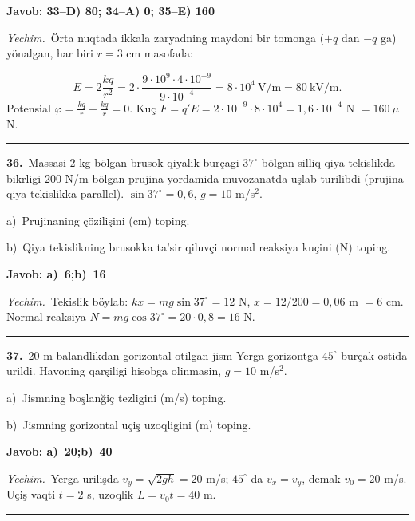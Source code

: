 \documentclass[11pt,a4paper]{article}
\begin{document}
\noindent\colorbox{gray!12}{\parbox{\dimexpr\linewidth-2\fboxsep}{\textbf{Javob: 33--D) 80; 34--A) 0; 35--E) 160}}}\par\smallskip
\noindent\textit{Yechim.}\ Örta nuqtada ikkala zaryadning maydoni bir tomonga ($+q$ dan $-q$ ga) yönalgan, har biri $r=3$ cm masofada:\par
\[E=2\frac{kq}{r^2}=2\cdot\frac{9\cdot10^9\cdot4\cdot10^{-9}}{9\cdot10^{-4}}=8\cdot10^4\ \text{V/m}=80\ \text{kV/m}.\]
Potensial $\varphi=\frac{kq}{r}-\frac{kq}{r}=0$. Kuç $F=q'E=2\cdot10^{-9}\cdot8\cdot10^4=1{,}6\cdot10^{-4}$ N $=160\ \mu$N.\par\par\medskip\hrule\medskip
{}\noindent\textbf{36.}\ Massasi 2 kg bölgan brusok qiyalik burçagi $37^\circ$ bölgan silliq qiya tekislikda bikrligi 200 N/m bölgan prujina yordamida muvozanatda uşlab turilibdi (prujina qiya tekislikka parallel). $\sin37^\circ=0{,}6$, $g=10$ m/s$^2$.\par
\noindent\hspace*{4mm}a)\ Prujinaning çözilişini (cm) toping.\par
\noindent\hspace*{4mm}b)\ Qiya tekislikning brusokka ta’sir qiluvçi normal reaksiya kuçini (N) toping.\par
\noindent\colorbox{gray!12}{\parbox{\dimexpr\linewidth-2\fboxsep}{\textbf{Javob: a)\ 6;\quad b)\ 16}}}\par\smallskip
\noindent\textit{Yechim.}\ Tekislik böylab: $kx=mg\sin37^\circ=12$ N, $x=12/200=0{,}06$ m $=6$ cm. Normal reaksiya $N=mg\cos37^\circ=20\cdot0{,}8=16$ N.\par\par\medskip\hrule\medskip
{}\noindent\textbf{37.}\ 20 m balandlikdan gorizontal otilgan jism Yerga gorizontga $45^\circ$ burçak ostida urildi. Havoning qarşiligi hisobga olinmasin, $g=10$ m/s$^2$.\par
\noindent\hspace*{4mm}a)\ Jismning boşlanğiç tezligini (m/s) toping.\par
\noindent\hspace*{4mm}b)\ Jismning gorizontal uçiş uzoqligini (m) toping.\par
\noindent\colorbox{gray!12}{\parbox{\dimexpr\linewidth-2\fboxsep}{\textbf{Javob: a)\ 20;\quad b)\ 40}}}\par\smallskip
\noindent\textit{Yechim.}\ Yerga urilişda $v_y=\sqrt{2gh}=20$ m/s; $45^\circ$ da $v_x=v_y$, demak $v_0=20$ m/s. Uçiş vaqti $t=2$ s, uzoqlik $L=v_0t=40$ m.\par\par\medskip\hrule\medskip
\end{document}
